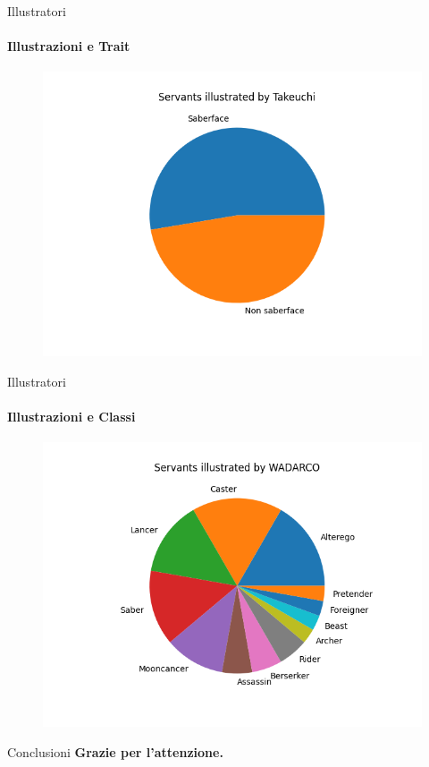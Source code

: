 \documentclass{beamer}
\begin{document}
\begin{darkframes}
  \begin{frame}{Illustratori}
    \framesubtitle{Illustrazioni e Trait}
    \begin{figure}
      \centering
      \includegraphics[scale=0.55]{./images/saberface.png}
    \end{figure}
  \end{frame}

  \begin{frame}{Illustratori}
    \framesubtitle{Illustrazioni e Classi}
    \begin{figure}
      \centering
      \includegraphics[scale=0.55]{./images/wadarco.png}
    \end{figure}
  \end{frame}

  \begin{frame}{Conclusioni}
    \textbf{Grazie per l'attenzione.}
  \end{frame}

\end{darkframes}
\end{document}

